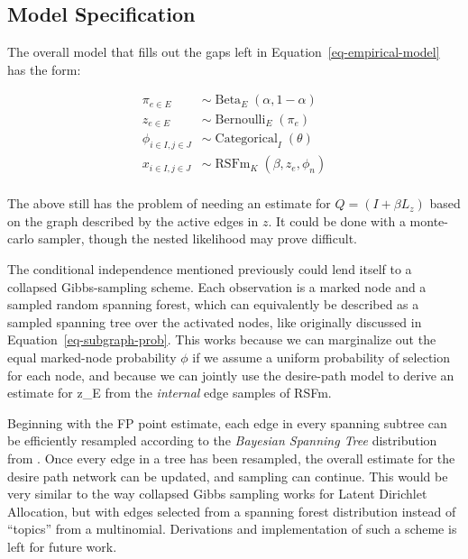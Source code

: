 \documentclass[%
	12pt,
		oneside,
		letterpaper
]{book}
\begin{document}
\subsection{Model Specification}\label{sec-lfa-gibbs}

The overall model that fills out the gaps left in Equation~\ref{eq-empirical-model} has the form:

\[
\begin{aligned}
\pi_{e\in E} &\sim \operatorname{Beta}_E(\alpha, 1-\alpha)     \\
z_{e\in E} &\sim \operatorname{Bernoulli}_E(\pi_e)             \\
\phi_{i\in I, j\in J} &\sim \operatorname{Categorical}_I(\theta) \\
x_{i\in I,j\in J} &\sim \operatorname{RSFm}_K(\beta, z_e, \phi_n) \\
\end{aligned}
\]

The above still has the problem of needing an estimate for \(Q=(I+\beta L_z)\) based on the graph described by the active edges in \(z\).
It could be done with a monte-carlo sampler, though the nested likelihood may prove difficult.

The conditional independence mentioned previously could lend itself to a collapsed Gibbs-sampling scheme.
Each observation is a marked node and a sampled random spanning forest, which can equivalently be described as a sampled spanning tree over the activated nodes, like originally discussed in Equation~\ref{eq-subgraph-prob}.
This works because we can marginalize out the equal marked-node probability \(\phi\) if we assume a uniform probability of selection for each node, and because we can jointly use the desire-path model to derive an estimate for z\_E from the \emph{internal} edge samples of RSFm.

Beginning with the FP point estimate, each edge in every spanning subtree can be efficiently resampled according to the \emph{Bayesian Spanning Tree} distribution from \textcite{BayesianSpanningTree_Duan2021}.
Once every edge in a tree has been resampled, the overall estimate for the desire path network can be updated, and sampling can continue.
This would be very similar to the way collapsed Gibbs sampling works for Latent Dirichlet Allocation\autocite{Latentdirichletallocation_Blei2003}, but with edges selected from a spanning forest distribution instead of ``topics'' from a multinomial.
Derivations and implementation of such a scheme is left for future work.
\end{document}
